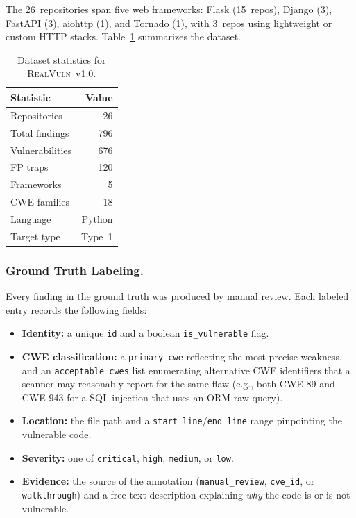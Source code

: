 The 26~repositories span five web frameworks: Flask (15~repos), Django (3), FastAPI (3), aiohttp (1), and Tornado (1), with 3~repos using lightweight or custom HTTP stacks.
Table~\ref{tab:dataset-stats} summarizes the dataset.

\begin{table}[t]
  \centering
  \caption{Dataset statistics for \textsc{RealVuln}~v1.0.}
  \label{tab:dataset-stats}
  \footnotesize
  \begin{tabular}{@{}lr@{}}
    \toprule
    \textbf{Statistic} & \textbf{Value} \\
    \midrule
    Repositories          & 26  \\
    Total findings        & 796 \\
    \quad Vulnerabilities & 676 \\
    \quad FP traps        & 120 \\
    Frameworks            & 5   \\
    CWE families          & 18  \\
    Language              & Python \\
    Target type           & Type~1 \\
    \bottomrule
  \end{tabular}
\end{table}

\subsubsection{Ground Truth Labeling.}
Every finding in the ground truth was produced by manual review.
Each labeled entry records the following fields:

\begin{itemize}
  \item \textbf{Identity:} a unique \texttt{id} and a boolean \texttt{is\_vulnerable} flag.
  \item \textbf{CWE classification:} a \texttt{primary\_cwe} reflecting the most precise weakness, and an \texttt{acceptable\_cwes} list enumerating alternative CWE identifiers that a scanner may reasonably report for the same flaw (e.g., both CWE-89 and CWE-943 for a SQL injection that uses an ORM raw query).
  \item \textbf{Location:} the file path and a \texttt{start\_line}/\texttt{end\_line} range pinpointing the vulnerable code.
  \item \textbf{Severity:} one of \texttt{critical}, \texttt{high}, \texttt{medium}, or \texttt{low}.
  \item \textbf{Evidence:} the source of the annotation (\texttt{manual\_review}, \texttt{cve\_id}, or \texttt{walkthrough}) and a free-text description explaining \emph{why} the code is or is not vulnerable.
\end{itemize}

